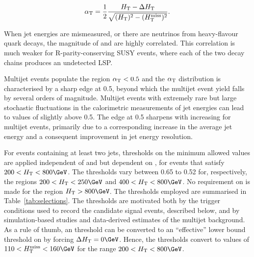 \begin{equation}
  \label{eq:alphat}
  \alpha_{\text{T}} = \frac{1}{2} \frac{H_{\mathrm{T}} -
    \Delta H_{\mathrm{T}}}{\sqrt{(H_{\mathrm{T}})^2 - (H_{\text{T}}^{\text{miss}})^2}}.
\end{equation}

When jet energies are mismeasured, or there are neutrinos from
heavy-flavour quark decays, the magnitude of \HTmiss and \dht are
highly correlated. This correlation is much weaker for
R-parity-conserving SUSY events, where each of the two decay chains
produces an undetected LSP.

Multijet events populate the region $\alpha_{\text{T}}< 0.5$ and the $\alpha_{\text{T}}$
distribution is characterised by a sharp edge at 0.5, beyond which the
multijet event yield falls by several orders of magnitude. Multijet
events with extremely rare but large stochastic fluctuations in the
calorimetric measurements of jet energies can lead to values of
\alphat slightly above 0.5. The edge at 0.5 sharpens with increasing
\scalht for multijet events, primarily due to a corresponding increase
in the average jet energy and a consequent improvement in jet energy
resolution. 

For events containing at least two jets, thresholds on the minimum
allowed \alphat values are applied independent of \njet and \nb but
dependent on \scalht, for events that satisfy $200 < \scalht <
800\GeV$. The \alphat thresholds vary between 0.65 to 0.52 for,
respectively, the regions $200 < \scalht < 250\GeV$ and $400 < \scalht
< 800\GeV$. No requirement on \alphat is made for the region $\scalht
> 800\GeV$. The thresholds employed are summarised in
Table~\ref{tab:selections}. The \alphat thresholds are motivated both
by the trigger conditions used to record the candidate signal events,
described below, and by simulation-based studies and data-derived
estimates of the multijet background. As a rule of thumb, an \alphat
threshold can be converted to an ``effective'' lower bound threshold
on \HTmiss by forcing $\dht = 0\GeV$. Hence, the \alphat thresholds
convert to values of $110 < \HTmiss < 160\GeV$ for the range $200 <
\scalht < 800\GeV$. 

